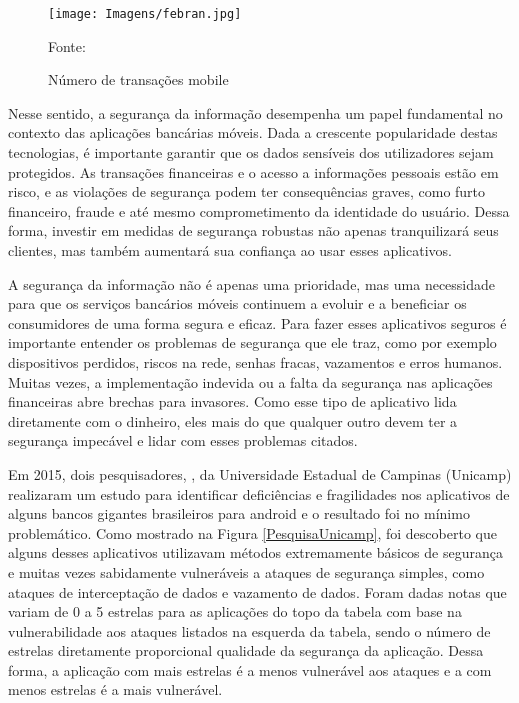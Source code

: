     \begin{figure}[H]
    \centering 
    \texttt{[image: Imagens/febran.jpg]}
    \caption{Número de transações mobile}
    Fonte: 
    \label{febran}
    \end{figure}
    
    
    Nesse sentido, a segurança da informação desempenha um papel fundamental no contexto das aplicações bancárias móveis. Dada a crescente popularidade destas tecnologias, é importante garantir que os dados sensíveis dos utilizadores sejam protegidos. As transações financeiras e o acesso a informações pessoais estão em risco, e as violações de segurança podem ter consequências graves, como furto financeiro, fraude e até mesmo comprometimento da identidade do usuário. Dessa forma, investir em medidas de segurança robustas não apenas tranquilizará seus clientes, mas também aumentará sua confiança ao usar esses aplicativos. 
    
    A segurança da informação não é apenas uma prioridade, mas uma necessidade para que os serviços bancários móveis continuem a evoluir e a beneficiar os consumidores de uma forma segura e eficaz. Para fazer esses aplicativos seguros é importante entender os problemas de segurança que ele traz, como por exemplo dispositivos perdidos, riscos na rede, senhas fracas, vazamentos e erros humanos. Muitas vezes, a implementação indevida ou a falta da segurança nas aplicações financeiras abre brechas para invasores. Como esse tipo de aplicativo lida diretamente com o dinheiro, eles mais do que qualquer outro devem ter a segurança impecável e lidar com esses problemas citados.
    
    Em 2015, dois pesquisadores, , da Universidade Estadual de Campinas (Unicamp) realizaram um estudo para identificar deficiências e fragilidades nos aplicativos de alguns bancos gigantes brasileiros para android e o resultado foi no mínimo problemático. Como mostrado na Figura \ref{PesquisaUnicamp}, foi descoberto que alguns desses aplicativos utilizavam métodos extremamente básicos de segurança e muitas vezes sabidamente vulneráveis a ataques de segurança simples, como ataques de interceptação de dados e vazamento de dados. Foram dadas notas que variam de 0 a 5 estrelas para as aplicações do topo da tabela com base na vulnerabilidade aos ataques listados na esquerda da tabela, sendo o número de estrelas diretamente proporcional qualidade da segurança da aplicação. Dessa forma, a aplicação com mais estrelas é a menos vulnerável aos ataques e a com menos estrelas é a mais vulnerável.   
    
